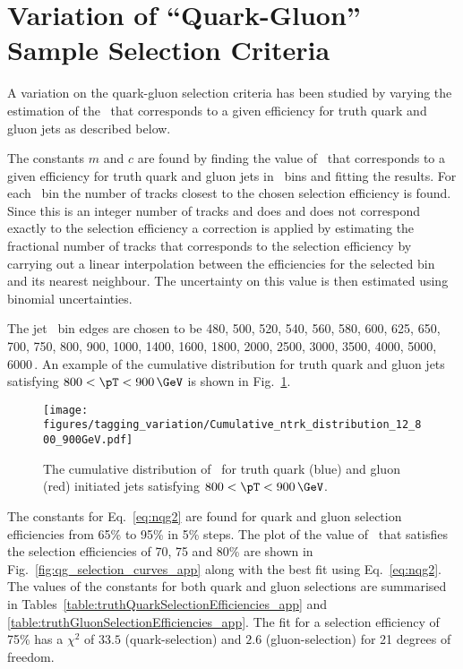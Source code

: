 \section{Variation of  ``Quark-Gluon'' Sample Selection Criteria }

A variation on the quark-gluon selection criteria has been studied by varying the 
estimation of the \ntrk\ that corresponds to a given efficiency for truth quark and gluon jets as described below.

The constants $m$ and $c$ are found by finding the value of \ntrk\ 
that corresponds to a given efficiency for truth quark and gluon jets in 
\pT\ bins and fitting the results. For each \pT\ bin the number of tracks 
closest to the chosen selection efficiency is found. Since this is an integer 
number of tracks and does and does not correspond exactly to the selection efficiency 
a correction is applied by estimating the fractional number of tracks that corresponds 
to the selection  efficiency  by carrying out a linear interpolation between the efficiencies 
for the selected bin and its nearest neighbour. The uncertainty on this value is then estimated using 
binomial uncertainties. 



The jet \pT\ bin edges are chosen to be 
480, 500, 520, 540, 560, 580, 600, 625, 650, 700, 750, 800, 900, 1000, 1400, 
1600, 1800, 2000, 2500, 3000, 3500, 4000, 5000, 6000\,\GeV. An example of the \ntrk cumulative 
distribution for truth quark and gluon jets satisfying $800 < \pT < 900\,\GeV$ is shown in
Fig.~\ref{fig:ntrk_cumulative_app}.


\begin{figure}[htb]
 \centering
\texttt{[image: figures/tagging\_variation/Cumulative\_ntrk\_distribution\_12\_800\_900GeV.pdf]}
\caption{The cumulative distribution of \ntrk\ for truth quark (blue) and gluon (red) initiated jets 
satisfying $800 < \pT < 900\,\GeV$.  \label{fig:ntrk_cumulative_app}}
\end{figure}


The constants for Eq.~\ref{eq:nqg2} are found for quark and gluon selection efficiencies from 
65\% to 95\% in 5\% steps. The plot of the value of \ntrk\ that satisfies the selection efficiencies 
of 70, 75 and 80\% are shown in Fig.~\ref{fig:qg_selection_curves_app} along with the best fit using Eq.~\ref{eq:nqg2}.
The values of the constants for both quark and gluon selections are summarised in 
Tables~\ref{table:truthQuarkSelectionEfficiencies_app} and \ref{table:truthGluonSelectionEfficiencies_app}. 
The fit for a selection efficiency of 75\% has a $\chi^2$ of $33.5$ (quark-selection) and $2.6$ 
(gluon-selection) for 21 degrees of freedom. 

